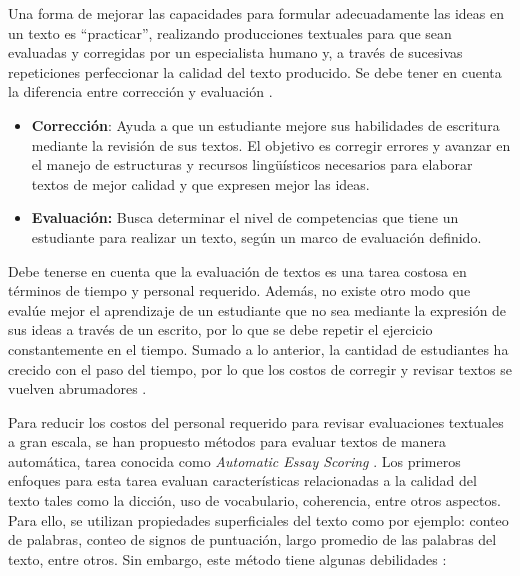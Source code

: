 \documentclass[12pt]{diicc}
\begin{document}
Una forma de mejorar las capacidades para formular adecuadamente las ideas en un texto es ``practicar'', realizando producciones textuales para que sean evaluadas y corregidas por un especialista humano y, a través de sucesivas repeticiones perfeccionar la calidad del texto producido. Se debe tener en cuenta la diferencia entre corrección y evaluación \cite{t18}.

\begin{itemize}
	\item {\bf Corrección}: Ayuda a que un estudiante mejore sus habilidades de escritura mediante la revisión de sus textos. El objetivo es corregir errores y avanzar en el manejo de estructuras y recursos lingüísticos necesarios para elaborar textos de mejor calidad y que expresen mejor las ideas.
	\item {\bf Evaluación:} Busca determinar el nivel de competencias que tiene un estudiante para realizar un texto, según un marco de evaluación definido.
\end{itemize}

Debe tenerse en cuenta que la evaluación de textos es una tarea costosa en términos de tiempo y personal requerido. Además, no existe otro modo que evalúe mejor el aprendizaje de un estudiante que no sea mediante la expresión de sus ideas a través de un escrito, por lo que se debe repetir el ejercicio constantemente en el tiempo. Sumado a lo anterior, la cantidad de estudiantes ha crecido con el paso del tiempo, por lo que los costos de corregir y revisar textos se vuelven abrumadores \cite{t10}.

Para reducir los costos del personal requerido para revisar evaluaciones textuales a gran escala, se han propuesto métodos para evaluar textos de manera automática, tarea conocida como {\em Automatic Essay Scoring} \cite{t9}. Los primeros enfoques para esta tarea evaluan características relacionadas a la calidad del texto tales como la dicción, uso de vocabulario, coherencia, entre otros aspectos. Para ello, se utilizan propiedades superficiales del texto como por ejemplo: conteo de palabras, conteo de signos de puntuación, largo promedio de las palabras del texto, entre otros. Sin embargo, este método tiene algunas debilidades \cite{t24}\cite{t25}:
\end{document}
